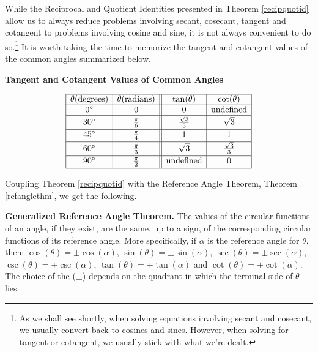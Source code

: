 \begin{ex}
\begin{enumerate}
\end{enumerate}

\end{ex}

While the Reciprocal and Quotient Identities presented in Theorem \ref{recipquotid} allow us to always reduce problems involving secant, cosecant, tangent and cotangent to problems involving cosine and sine, it is not always convenient to do so.\footnote{As we shall see shortly, when solving equations involving secant and cosecant, we usually convert back to cosines and sines.  However, when solving for tangent or cotangent, we usually stick with what we're dealt.}  It is worth taking the time to memorize the tangent and cotangent values of the common angles summarized below.

\begin{center}

\textbf{Tangent and Cotangent Values of Common Angles}

\vspace{-.25in}

\setlength{\extrarowheight}{4pt}

\[ \begin{array}{|c|c||c|c|} \hline
 \theta (\mbox{degrees}) &  \theta (\mbox{radians}) & \tan(\theta) & \cot(\theta) \\ \hline
0^{\circ} & 0 & 0 & \text{undefined} \\ \hline
30^{\circ} & \frac{\pi}{6} & \frac{\sqrt{3}}{3} & \sqrt{3} \\ [2pt] \hline
45^{\circ} & \frac{\pi}{4} & 1 & 1 \\ [2pt] \hline
60^{\circ} & \frac{\pi}{3} & \sqrt{3} & \frac{\sqrt{3}}{3} \\ [2pt] \hline
90^{\circ} & \frac{\pi}{2} & \text{undefined} & 0 \\ [2pt] \hline
\end{array} \]

\setlength{\extrarowheight}{2pt}

\end{center}

Coupling Theorem \ref{recipquotid} with the Reference Angle Theorem, Theorem \ref{refanglethm}, we get the following.

\smallskip

\colorbox{ResultColor}{\bbm

\begin{thm} \label{genrefanglethm} \textbf{Generalized Reference Angle Theorem.}  The values of the circular functions of an angle, if they exist, are the same, up to a sign, of the corresponding circular functions of its reference angle.  More specifically, if $\alpha$ is the reference angle for $\theta$,  then: $\cos(\theta)  = \pm \cos(\alpha)$, $\sin(\theta)  = \pm \sin(\alpha)$, $\sec(\theta)  = \pm \sec(\alpha)$, $\csc(\theta)  = \pm \csc(\alpha)$, $\tan(\theta)  = \pm \tan(\alpha)$ and $\cot(\theta)  = \pm \cot(\alpha)$.  The choice of the ($\pm$) depends on the quadrant in which the terminal side of $\theta$ lies. 

\end{thm}

\ebm}

